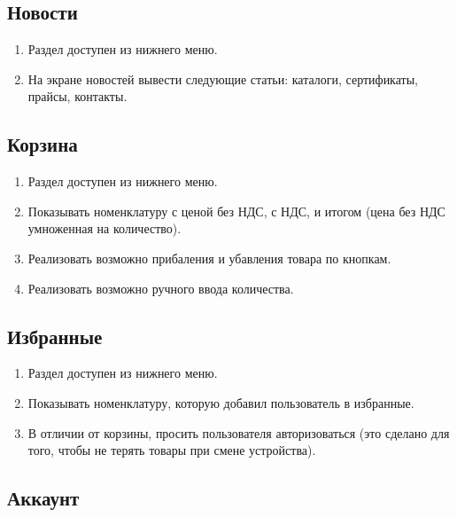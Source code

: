 \subsection{Новости}

\begin{enumerate}[label=\thesubsection.\arabic*, leftmargin=3cm]
    \item Раздел доступен из нижнего меню.
    \item На экране новостей вывести следующие статьи: каталоги, сертификаты, прайсы, контакты.
\end{enumerate}

\subsection{Корзина}

\begin{enumerate}[label=\thesubsection.\arabic*, leftmargin=3cm]
    \item Раздел доступен из нижнего меню.
    \item Показывать номенклатуру с ценой без НДС, с НДС, и итогом (цена без НДС умноженная на количество).
    \item Реализовать возможно прибаления и убавления товара по кнопкам.
    \item Реализовать возможно ручного ввода количества.
\end{enumerate}

\subsection{Избранные}

\begin{enumerate}[label=\thesubsection.\arabic*, leftmargin=3cm]
    \item Раздел доступен из нижнего меню.
    \item Показывать номенклатуру, которую добавил пользователь в избранные.
    \item В отличии от корзины, просить пользователя авторизоваться
    (это сделано для того, чтобы не терять товары при смене устройства).
\end{enumerate}

\subsection{Аккаунт}

